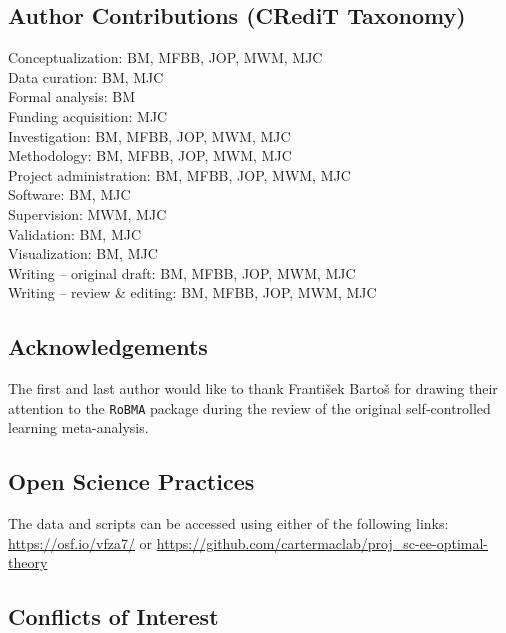 \documentclass[
  doc, donotrepeattitle,floatsintext]{apa7}
\begin{document}
\vfill

\hypertarget{author-contributions-credit-taxonomy}{%
\subsection{Author Contributions (CRediT Taxonomy)}\label{author-contributions-credit-taxonomy}}

\noindent Conceptualization: BM, MFBB, JOP, MWM, MJC\\
Data curation: BM, MJC\\
Formal analysis: BM\\
Funding acquisition: MJC\\
Investigation: BM, MFBB, JOP, MWM, MJC\\
Methodology: BM, MFBB, JOP, MWM, MJC\\
Project administration: BM, MFBB, JOP, MWM, MJC\\
Software: BM, MJC\\
Supervision: MWM, MJC\\
Validation: BM, MJC\\
Visualization: BM, MJC\\
Writing -- original draft: BM, MFBB, JOP, MWM, MJC\\
Writing -- review \& editing: BM, MFBB, JOP, MWM, MJC

\hypertarget{acknowledgements}{%
\subsection{Acknowledgements}\label{acknowledgements}}

\noindent The first and last author would like to thank František Bartoš for drawing their attention to the \texttt{RoBMA} package during the review of the original self-controlled learning meta-analysis.

\hypertarget{open-science-practices}{%
\subsection{Open Science Practices}\label{open-science-practices}}

\noindent The data and scripts can be accessed using either of the following links: \url{https://osf.io/vfza7/} or \url{https://github.com/cartermaclab/proj_sc-ee-optimal-theory}

\hypertarget{conflicts-of-interest}{%
\subsection{Conflicts of Interest}\label{conflicts-of-interest}}
\end{document}
